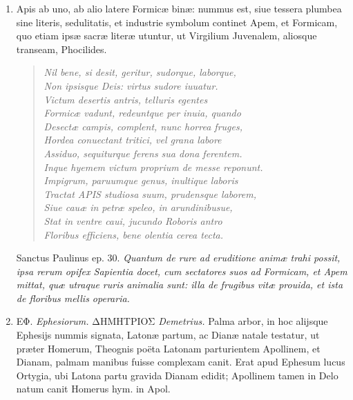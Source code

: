 \documentclass[a4paper, 11pt, oneside, polutonikogreek, latin]{article}
\begin{document}
\begin{enumerate}
    \item Apis ab uno, ab alio latere Formicæ binæ: nummus est, siue tessera plumbea sine literis, sedulitatis, et industrie symbolum continet Apem, et Formicam, quo etiam ipsæ sacræ literæ utuntur, ut Virgilium Juvenalem, aliosque transeam, Phocilides.
    
    \begin{quote}
    \emph{Nil bene, si desit, geritur, sudorque, laborque,}\\
    \emph{Non ipsisque Deis: virtus sudore iuuatur.}\\
    \emph{Victum desertis antris, telluris egentes}\\
    \emph{Formicæ vadunt, redeuntque per inuia, quando}\\
    \emph{Desectæ campis, complent, nunc horrea fruges,}\\
    \emph{Hordea conuectant tritici, vel grana labore}\\
    \emph{Assiduo, sequiturque ferens sua dona ferentem.}\\
    \emph{Inque hyemem victum proprium de messe reponunt.}\\
    \emph{Impigrum, paruumque genus, inultique laboris}\\
    \emph{Tractat APIS studiosa suum, prudensque laborem,}\\
    \emph{Siue cauæ in petræ speleo, in arundinibusue,}\\
    \emph{Stat in ventre caui, jucundo Roboris antro}\\
    \emph{Floribus efficiens, bene olentia cerea tecta.}\\
    \end{quote}
    
    Sanctus Paulinus ep. 30. \emph{Quantum de rure ad eruditione animæ trahi possit, ipsa rerum opifex Sapientia docet, cum sectatores suos ad Formicam, et Apem mittat, quæ utraque ruris animalia sunt: illa de frugibus vitæ prouida, et ista de floribus mellis operaria.}

    \item \foreignlanguage{greek}{ΕΦ.} \emph{Ephesiorum.} \foreignlanguage{greek}{ΔΗΜΗΤΡΙΟΣ} \emph{Demetrius.} Palma arbor, in hoc alijsque Ephesijs nummis signata, Latonæ partum, ac Dianæ natale testatur, ut præter Homerum, Theognis poëta Latonam parturientem Apollinem, et Dianam, palmam manibus fuisse complexam canit. Erat apud Ephesum lucus Ortygia, ubi Latona partu gravida Dianam edidit; Apollinem tamen in Delo natum canit Homerus hym. in Apol.
    

\end{enumerate}
\end{document}
